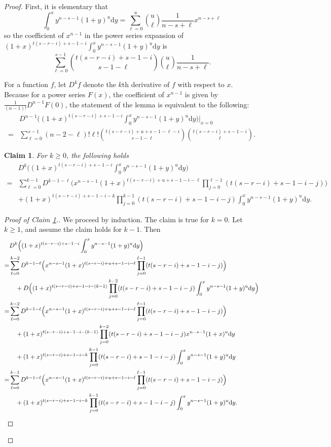 \documentclass[11pt]{amsart}
\newtheorem{claim}[theorem]{Claim}
\theoremstyle{definition}
\newcommand{\0}{\emptyset}
\begin{document}
\begin{proof}
First, it is elementary that
\[\int_0^xy^{n-s-1}(1+y)^u\mathrm{d}y=\sum_{\ell=0}^u\binom{u}{\ell}\frac{1}{n-s+\ell}x^{n-s+\ell}\]
so the coefficient of $x^{n-1}$ in the power series expansion of $(1+x)^{t(s-r-i)+s-1-i}\int_0^xy^{n-s-1}(1+y)^u\mathrm{d}y$ is
\[\sum_{\ell=0}^{s-1}\binom{t(s-r-i)+s-1-i}{s-1-\ell}\binom{u}{\ell}\frac{1}{n-s+\ell}.\]

For a function $f$, let $D^kf$ denote the $k$th derivative of $f$ with respect to $x$. Because for a power series $F(x)$, the coefficient of $x^{n-1}$ is given by $\frac{1}{(n-1)!}D^{n-1}F(0)$, the statement of the lemma is equivalent to the following:
\begin{align*}
&D^{n-1}\Big((1+x)^{t(s-r-i)+s-1-i}\int_0^xy^{n-s-1}(1+y)^u\mathrm{d}y\Big)\Big\rvert_{x=0}\\
=&\sum_{\ell=0}^{s-1}(n-2-\ell)!\ell!\binom{t(s-r-i)+u+s-1-\ell-i}{s-1-\ell}\binom{t(s-r-i)+s-1-i}{\ell}.
\end{align*}
\begin{claim}\label{derivative claim}
For $k\geq 0$, the following holds
\begin{align*}
    &D^{k}\Big((1+x)^{t(s-r-i)+s-1-i}\int_0^xy^{n-s-1}(1+y)^u\mathrm{d}y\Big)\\
    =&\sum_{\ell=0}^{k-1}D^{k-1-\ell}\Big(x^{n-s-1}(1+x)^{t(s-r-i)+u+s-1-i-\ell}\prod_{j=0}^{\ell-1}(t(s-r-i)+s-1-i-j)\Big)\\
    &+(1+x)^{t(s-r-i)+s-1-i-k}\prod_{j=0}^{k-1}(t(s-r-i)+s-1-i-j)\int_0^xy^{n-s-1}(1+y)^u\mathrm{d}y.
\end{align*}
\end{claim}
\begin{proof}[Proof of Claim \ref{derivative claim}.]
We proceed by induction. The claim is true for $k=0$. Let $k\geq 1$, and assume the claim holds for $k-1$. Then
\begin{align*}
    &D^{k}\Big((1+x)^{t(s-r-i)+s-1-i}\int_0^xy^{n-s-1}(1+y)^u\mathrm{d}y\Big)\\
    =&\sum_{\ell=0}^{k-2}D^{k-1-\ell}\Big(x^{n-s-1}(1+x)^{t(s-r-i)+u+s-1-i-\ell}\prod_{j=0}^{\ell-1}(t(s-r-i)+s-1-i-j)\Big)\\
    &\quad+D\Big((1+x)^{t(s-r-i)+s-1-i-(k-1)}\prod_{j=0}^{k-2}(t(s-r-i)+s-1-i-j)\int_0^xy^{n-s-1}(1+y)^u\mathrm{d}y\Big)\\
    =&\sum_{\ell=0}^{k-2}D^{k-1-\ell}\Big(x^{n-s-1}(1+x)^{t(s-r-i)+u+s-1-i-\ell}\prod_{j=0}^{\ell-1}(t(s-r-i)+s-1-i-j)\Big)\\
    &\quad+(1+x)^{t(s-r-i)+s-1-i-(k-1)}\prod_{j=0}^{k-2}(t(s-r-i)+s-1-i-j)x^{n-s-1}(1+x)^u\mathrm{d}y\\
    &\quad+(1+x)^{t(s-r-i)+s-1-i-k}\prod_{j=0}^{k-1}(t(s-r-i)+s-1-i-j)\int_0^xy^{n-s-1}(1+y)^u\mathrm{d}y\\
    =&\sum_{\ell=0}^{k-1}D^{k-1-\ell}\Big(x^{n-s-1}(1+x)^{t(s-r-i)+u+s-1-i-\ell}\prod_{j=0}^{\ell-1}(t(s-r-i)+s-1-i-j)\Big)\\
    &\quad+(1+x)^{t(s-r-i)+s-1-i-k}\prod_{j=0}^{k-1}(t(s-r-i)+s-1-i-j)\int_0^xy^{n-s-1}(1+y)^u\mathrm{d}y.
\qedhere\end{align*}
\end{proof}


\end{proof}
\end{document}
